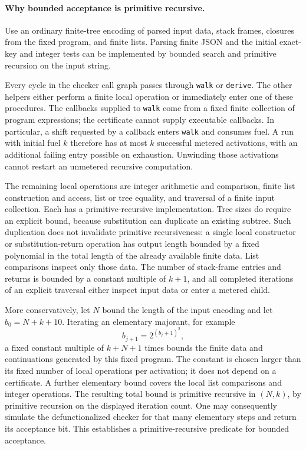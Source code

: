 \paragraph{Why bounded acceptance is primitive recursive.}
Use an ordinary finite-tree encoding of parsed input data, stack frames,
closures from the fixed program, and finite lists. Parsing finite JSON and
the initial exact-key and integer tests can be implemented by bounded
search and primitive recursion on the input string.

Every cycle in the checker call graph passes through \texttt{walk} or
\texttt{derive}. The other helpers either perform a finite local operation
or immediately enter one of these procedures. The callbacks supplied to
\texttt{walk} come from a fixed finite collection of program expressions;
the certificate cannot supply executable callbacks. In particular, a shift
requested by a callback enters \texttt{walk} and consumes fuel. A run with
initial fuel $k$ therefore has at most $k$ successful metered activations,
with an additional failing entry possible on exhaustion. Unwinding those
activations cannot restart an unmetered recursive computation.

The remaining local operations are integer arithmetic and comparison,
finite list construction and access, list or tree equality, and traversal
of a finite input collection. Each has a primitive-recursive implementation.
Tree sizes do require an explicit bound, because substitution can duplicate
an existing subtree. Such duplication does not invalidate primitive
recursiveness: a single local constructor or substitution-return operation
has output length bounded by a fixed polynomial in the total length of the
already available finite data. List comparisons inspect only those data.
The number of stack-frame entries and returns is bounded by a constant
multiple of $k+1$, and all completed iterations of an explicit traversal
either inspect input data or enter a metered child.

More conservatively, let $N$ bound the length of the input encoding and let
$b_0=N+k+10$. Iterating an elementary majorant, for example
\[
             b_{j+1}=2^{(b_j+1)^2},
\]
a fixed constant multiple of $k+N+1$ times bounds the finite data and
continuations generated by this fixed program. The constant is chosen
larger than its fixed number of local operations per activation; it does
not depend on a certificate. A further elementary bound covers the local
list comparisons and integer operations. The resulting total bound is
primitive recursive in $(N,k)$, by primitive recursion on the displayed
iteration count. One may consequently simulate the defunctionalized
checker for that many elementary steps and return its acceptance bit.
This establishes a primitive-recursive predicate for bounded acceptance.

